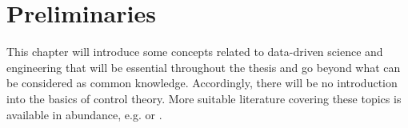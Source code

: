 \section{Preliminaries}
\label{Chapter:Prelims}
This chapter will introduce some concepts related to data-driven science and engineering that will be essential throughout the thesis and go beyond what can be considered as common knowledge. Accordingly, there will be no introduction into the basics of control theory. More suitable literature covering these topics is available in abundance, e.g. \cite{Ogata} or \cite{Skogestad}. 






\newpage